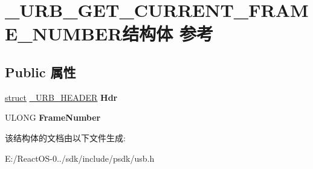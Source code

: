 \hypertarget{struct___u_r_b___g_e_t___c_u_r_r_e_n_t___f_r_a_m_e___n_u_m_b_e_r}{}\section{\+\_\+\+U\+R\+B\+\_\+\+G\+E\+T\+\_\+\+C\+U\+R\+R\+E\+N\+T\+\_\+\+F\+R\+A\+M\+E\+\_\+\+N\+U\+M\+B\+E\+R结构体 参考}
\label{struct___u_r_b___g_e_t___c_u_r_r_e_n_t___f_r_a_m_e___n_u_m_b_e_r}
\subsection*{Public 属性}
\begin{DoxyCompactItemize}
\item 
\mbox{\label{struct___u_r_b___g_e_t___c_u_r_r_e_n_t___f_r_a_m_e___n_u_m_b_e_r_a4fd856188fdf13200ed8f78751850e8d}} 
\hyperlink{interfacestruct}{struct} \hyperlink{struct___u_r_b___h_e_a_d_e_r}{\+\_\+\+U\+R\+B\+\_\+\+H\+E\+A\+D\+ER} {\bfseries Hdr}
\item 
\mbox{\label{struct___u_r_b___g_e_t___c_u_r_r_e_n_t___f_r_a_m_e___n_u_m_b_e_r_a6c95e8870fabe4777426fbfcecbfcab8}} 
U\+L\+O\+NG {\bfseries Frame\+Number}
\end{DoxyCompactItemize}


该结构体的文档由以下文件生成\+:\begin{DoxyCompactItemize}
\item 
E\+:/\+React\+O\+S-\/0../sdk/include/psdk/usb.\+h\end{DoxyCompactItemize}
